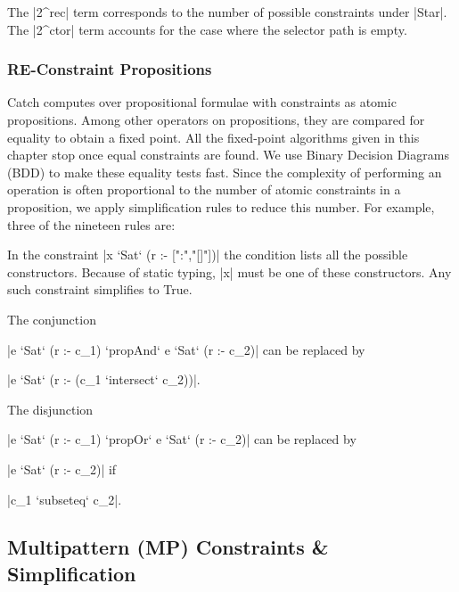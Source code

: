 The |2^rec| term corresponds to the number of possible constraints under |Star|. The |2^ctor| term accounts for the case where the selector path is empty.


\subsubsection{RE-Constraint Propositions}
\label{secC:re-propositions}

Catch computes over propositional formulae with constraints as atomic propositions. Among other operators on propositions, they are compared for equality to obtain a fixed point. All the fixed-point algorithms given in this chapter stop once equal constraints are found. We use Binary Decision Diagrams (BDD) \cite{lee:bdd} to make these equality tests fast. Since the complexity of performing an operation is often proportional to the number of atomic constraints in a proposition, we apply simplification rules to reduce this number. For example, three of the nineteen rules are:

 In the constraint |x `Sat` (r :- [":","[]"])| the condition lists all the possible constructors. Because of static typing, |x| must be one of these constructors. Any such constraint simplifies to True.

 The conjunction \ignore|e `Sat` (r :- c_1) `propAnd` e `Sat` (r :- c_2)| can be replaced by \ignore|e `Sat` (r :- (c_1 `intersect` c_2))|.

 The disjunction \ignore|e `Sat` (r :- c_1) `propOr` e `Sat` (r :- c_2)| can be replaced by \ignore|e `Sat` (r :- c_2)| if \ignore|c_1 `subseteq` c_2|.


\subsection{Multipattern (MP) Constraints \& Simplification}
\label{secC:multipattern}

